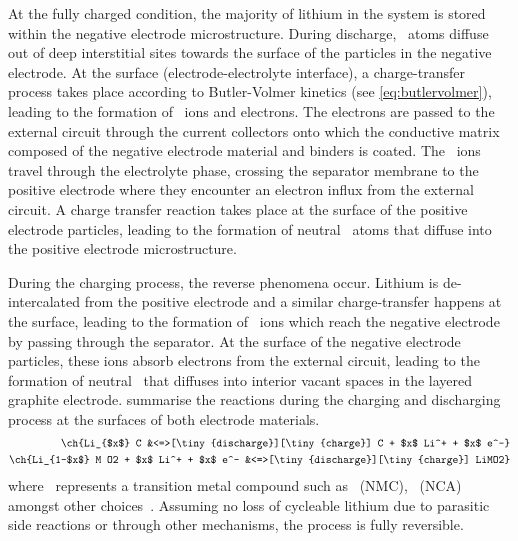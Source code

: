 At the fully charged condition, the majority  of lithium in the system is stored
within the negative electrode  microstructure. During discharge, ~atoms
diffuse out of  deep interstitial sites towards the surface  of the particles in
the  negative  electrode.  At  the  surface  (electrode-electrolyte  interface),
a  charge-transfer  process  takes  place according  to  Butler-Volmer  kinetics
(see  \cref{eq:butlervolmer}), leading  to the  formation of  ~ions and
electrons. The electrons are passed to  the external circuit through the 
current collectors  onto which  the conductive matrix  composed of  the negative
electrode material and binders is  coated. The ~ions travel through the
electrolyte phase,  crossing the  separator membrane  to the  positive electrode
where they  encounter an  electron influx  from the  external circuit.  A charge
transfer  reaction  takes  place  at  the  surface  of  the  positive  electrode
particles, leading to the formation of neutral ~atoms that diffuse into
the positive electrode microstructure.

During  the   charging  process,  the   reverse  phenomena  occur.   Lithium  is
de-intercalated  from  the  positive  electrode and  a  similar  charge-transfer
happens  at  the surface,  leading  to  the  formation of  ~ions  which
reach  the  negative  electrode  by   passing  through  the  separator.  At  the
surface of  the negative electrode  particles, these ions absorb  electrons from
the  external  circuit,  leading  to the  formation  of  neutral~  that
diffuses  into  interior  vacant  spaces  in  the  layered  graphite  electrode.
 summarise the  reactions during the
charging and discharging process at the surfaces of both electrode materials.
\begin{align}
    \ch{Li_{$x$} C                            &<=>[\tiny{discharge}][\tiny{charge}] C + $x$ Li^+ + $x$ e^-}\label{eq:NegElectrodeRxn}\\
    \ch{Li_{1-$x$} M O2 + $x$ Li^+  + $x$ e^- &<=>[\tiny{discharge}][\tiny{charge}] LiMO2}\label{eq:PosElectrodeRxn}
\end{align}
where    ~represents    a    transition   metal    compound   such    as
~(NMC),   ~(NCA)
amongst other  choices~\cite{Reddy2011}. Assuming  no loss of  cycleable lithium
due to  parasitic side  reactions or  through other  mechanisms, the  process is
fully reversible.


